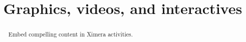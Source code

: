 \documentclass{ximera}
\title{Graphics, videos, and interactives}
\begin{document}
\begin{abstract}
    Embed compelling content in Ximera activities.
\end{abstract}
\maketitle
\end{document}
